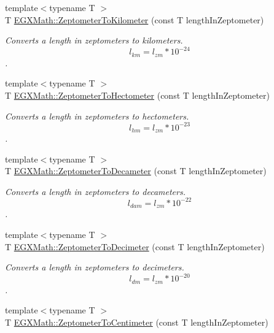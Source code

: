 \begin{DoxyCompactItemize}
{\footnotesize template$<$typename T $>$ }\\T \mbox{\hyperlink{group___e_g_x_math-_conversions-_length_conversions-_s_i-_zeptometer-_s_i_ga687dc5d33c63561c87a06568fd928da9}{E\+G\+X\+Math\+::\+Zeptometer\+To\+Kilometer}} (const T length\+In\+Zeptometer)
\begin{DoxyCompactList}\small\item\em Converts a length in zeptometers to kilometers. \[ l_{km}=l_{zm} * 10^{-24} \]. \end{DoxyCompactList}\item 
{\footnotesize template$<$typename T $>$ }\\T \mbox{\hyperlink{group___e_g_x_math-_conversions-_length_conversions-_s_i-_zeptometer-_s_i_ga4f9724a5c86f9e85aee3bad4d04a7faa}{E\+G\+X\+Math\+::\+Zeptometer\+To\+Hectometer}} (const T length\+In\+Zeptometer)
\begin{DoxyCompactList}\small\item\em Converts a length in zeptometers to hectometers. \[ l_{hm}=l_{zm} * 10^{-23} \]. \end{DoxyCompactList}\item 
{\footnotesize template$<$typename T $>$ }\\T \mbox{\hyperlink{group___e_g_x_math-_conversions-_length_conversions-_s_i-_zeptometer-_s_i_ga4076e322cf0f16f1eb977409e4f8f251}{E\+G\+X\+Math\+::\+Zeptometer\+To\+Decameter}} (const T length\+In\+Zeptometer)
\begin{DoxyCompactList}\small\item\em Converts a length in zeptometers to decameters. \[ l_{dam}=l_{zm} * 10^{-22} \]. \end{DoxyCompactList}\item 
{\footnotesize template$<$typename T $>$ }\\T \mbox{\hyperlink{group___e_g_x_math-_conversions-_length_conversions-_s_i-_zeptometer-_s_i_ga9a25b6696c3f6ed8df86a77e1da46830}{E\+G\+X\+Math\+::\+Zeptometer\+To\+Decimeter}} (const T length\+In\+Zeptometer)
\begin{DoxyCompactList}\small\item\em Converts a length in zeptometers to decimeters. \[ l_{dm}=l_{zm} * 10^{-20} \]. \end{DoxyCompactList}\item 
{\footnotesize template$<$typename T $>$ }\\T \mbox{\hyperlink{group___e_g_x_math-_conversions-_length_conversions-_s_i-_zeptometer-_s_i_ga11d9546ba555e2fca128d6c905fed139}{E\+G\+X\+Math\+::\+Zeptometer\+To\+Centimeter}} (const T length\+In\+Zeptometer)

\end{DoxyCompactItemize}
